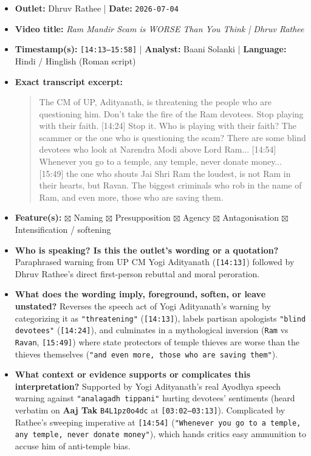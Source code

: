 \documentclass[10pt,a4paper]{article}
\begin{document}
\begin{itemize}[leftmargin=1.5em, itemsep=3pt, topsep=4pt]
  \item \textbf{Outlet:} Dhruv Rathee | \textbf{Date:} \texttt{2026-07-04}
  \item \textbf{Video title:} \textit{Ram Mandir Scam is WORSE Than You Think | Dhruv Rathee}
  \item \textbf{Timestamp(s):} \texttt{[14:13--15:58]} | \textbf{Analyst:} Baani Solanki | \textbf{Language:} Hindi / Hinglish (Roman script)
  \item \textbf{Exact transcript excerpt:}
    \begin{quote}\small\ttfamily [14:13] The CM of UP, Adityanath, is threatening the people who are questioning him. Don't take the fire of the Ram devotees. Stop playing with their faith. [14:24] Stop it. Who is playing with their faith? The scammer or the one who is questioning the scam? There are some blind devotees who look at Narendra Modi above Lord Ram... [14:54] Whenever you go to a temple, any temple, never donate money... [15:49] the one who shouts Jai Shri Ram the loudest, is not Ram in their hearts, but Ravan. The biggest criminals who rob in the name of Ram, and even more, those who are saving them.\end{quote}
  \item \textbf{Feature(s):} $\boxtimes$ Naming $\boxtimes$ Presupposition $\boxtimes$ Agency $\boxtimes$ Antagonisation $\boxtimes$ Intensification / softening
  \item \textbf{Who is speaking? Is this the outlet's wording or a quotation?} Paraphrased warning from UP CM Yogi Adityanath (\texttt{[14:13]}) followed by Dhruv Rathee's direct first-person rebuttal and moral peroration.
  \item \textbf{What does the wording imply, foreground, soften, or leave unstated?} Reverses the speech act of Yogi Adityanath's warning by categorizing it as \texttt{"threatening"} (\texttt{[14:13]}), labels partisan apologists \texttt{"blind devotees"} (\texttt{[14:24]}), and culminates in a mythological inversion (\texttt{Ram} vs \texttt{Ravan}, \texttt{[15:49]}) where state protectors of temple thieves are worse than the thieves themselves (\texttt{"and even more, those who are saving them"}).
  \item \textbf{What context or evidence supports or complicates this interpretation?} Supported by Yogi Adityanath's real Ayodhya speech warning against \texttt{"analagadh tippani"} hurting devotees' sentiments (heard verbatim on \textbf{Aaj Tak} \texttt{B4L1pz0o4dc} at \texttt{[03:02--03:13]}). Complicated by Rathee's sweeping imperative at \texttt{[14:54]} (\texttt{"Whenever you go to a temple, any temple, never donate money"}), which hands critics easy ammunition to accuse him of anti-temple bias.

\end{itemize}
\end{document}
